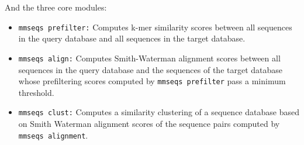 \documentclass[11pt,a4paper]{scrreprt}
\begin{document}
And the three core modules:
\begin{itemize}
\item \texttt{mmseqs prefilter:} Computes k-mer similarity scores between all sequences in the query database and all sequences in the target database.
\item \texttt{mmseqs align:} Computes Smith-Waterman alignment scores between all sequences in the query database and the sequences of the target database whose prefiltering scores computed by \texttt{mmseqs prefilter} pass a minimum threshold.
\item \texttt{mmseqs clust:} Computes a similarity clustering of a sequence database based on Smith Waterman alignment scores of the sequence pairs computed by \texttt{mmseqs alignment}.
\end{itemize}
\end{document}
